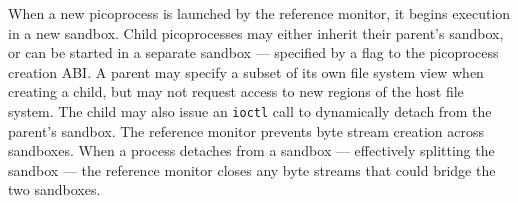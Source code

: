 When a new picoprocess is launched by the reference monitor, it begins execution in 
a new sandbox.  
Child picoprocesses may either inherit their parent's sandbox, 
or can be started in a separate sandbox
--- specified by a flag to the picoprocess creation ABI.
A parent may specify a subset of its own file system view 
when creating a child, but may not request access to new regions of the 
host file system. 
The child may also issue an {\tt ioctl} call to 
dynamically detach from the parent's sandbox. The reference monitor prevents byte stream creation 
across sandboxes.
When a process detaches from a sandbox --- effectively splitting the sandbox ---
the reference monitor closes
any byte streams that could bridge the two sandboxes.


\begin{comment}
We hasten to note that program counter filtering
is only provided for backwards compatibility, not security.
An attacker can compromise the \pal{}, so system policies are enforced
externally by the reference monitor.


Dynamically redirecting system calls to {\tt libLinux} is 
less efficient than dynamically linking against
the \graphene{} libc or statically compiling {\tt libLinux} into the application.
The overhead of dynamic redirection comes from 
transferring control to the kernel, then back to 
the \pal{}, and then to {\tt libLinux}.
We leave exploration of more efficient alternatives for future work,
such as redirecting the hardware system call table to {\tt libLinux}
on a host system like Dune~\cite{belay12dune},
or dynamically rewriting parts of the static binary~\cite{hunt99detours}.
\end{comment}

